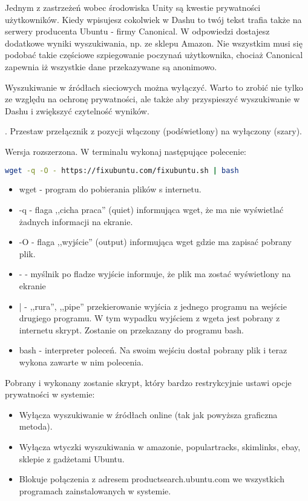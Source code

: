 Jednym z zastrzeżeń wobec środowiska Unity są kwestie prywatności użytkowników. Kiedy wpisujesz cokolwiek w Dashu to twój tekst trafia także na serwery producenta Ubuntu - firmy Canonical. W odpowiedzi dostajesz dodatkowe wyniki wyszukiwania, np. ze sklepu Amazon. Nie wszystkim musi się podobać takie częściowe szpiegowanie poczynań użytkownika, chociaż Canonical zapewnia iż wszystkie dane przekazywane są anonimowo.

Wyszukiwanie w źródłach sieciowych można wyłączyć. Warto to zrobić nie tylko ze względu na ochronę prywatności, ale także aby przyspieszyć wyszukiwanie w Dashu i zwiększyć czytelność wyników.

\noindent {}. Przestaw przełącznik z pozycji włączony (podświetlony) na wyłączony (szary).

Wersja rozszerzona. W terminalu wykonaj następujące polecenie:
\begin{lstlisting}[language=bash]
wget -q -O - https://fixubuntu.com/fixubuntu.sh | bash
\end{lstlisting}
\begin{itemize}
\item \textcolor{ubuntu_orange}{wget} - program do pobierania plików s internetu.
\item \textcolor{ubuntu_orange}{-q} - flaga ,,cicha praca'' (quiet) informująca wget, że ma nie wyświetlać żadnych informacji na ekranie.
\item \textcolor{ubuntu_orange}{-O} - flaga ,,wyjście'' (output) informująca wget gdzie ma zapisać pobrany plik.
\item \textcolor{ubuntu_orange}{-} - myślnik po fladze wyjście informuje, że plik ma zostać wyświetlony na ekranie
\item \textcolor{ubuntu_orange}{|} - ,,rura'', ,,pipe'' przekierowanie wyjścia z jednego programu na wejście drugiego programu. W tym wypadku wyjściem z wgeta jest pobrany z internetu skrypt. Zostanie on przekazany do programu bash.
\item \textcolor{ubuntu_orange}{bash} - interpreter poleceń. Na swoim wejściu dostał pobrany plik i teraz wykona zawarte w nim polecenia.
\end{itemize}
Pobrany i wykonany zostanie skrypt, który bardzo restrykcyjnie ustawi opcje prywatności w systemie:
\begin{itemize}
\item Wyłącza wyszukiwanie w źródłach online (tak jak powyższa graficzna metoda).
\item Wyłącza wtyczki wyszukiwania w amazonie, populartracks, skimlinks, ebay, sklepie z gadżetami Ubuntu.
\item Blokuje połączenia z adresem productsearch.ubuntu.com we wszystkich programach zainstalowanych w systemie.
\end{itemize}
